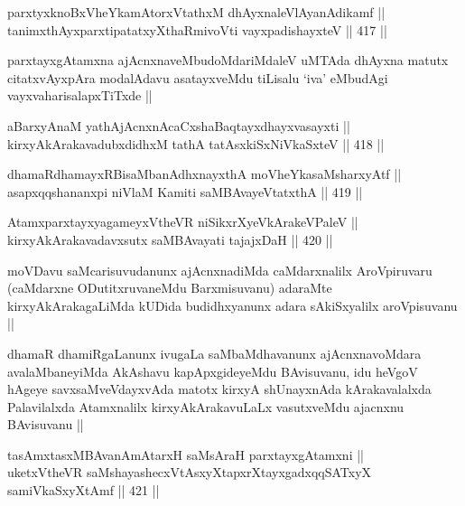 
\begin{shl}
parxtyxknoBxVheYkamAtorxVtathxM dhAyxnaleVlAyanAdikamf || \\
tanimxthAyxparxtipatatxyXthaRmivoVti vayxpadishayxteV ||  417 ||  
\end{shl}

\begin{artha}
parxtayxgAtamxna ajAcnxnaveMbudoMdariMdaleV uMTAda dhAyxna matutx citatxvAyxpAra modalAdavu asatayxveMdu tiLisalu `iva' eMbudAgi vayxvaharisalapxTiTxde ||
\end{artha}


\begin{shl}
aBarxyAnaM yathA\s jAcnxnAcaCxshaBaqtayxdhayxvasayxti || \\
kirxyAkArakavadubxdidhxM tathA tatAsxkiSxNiVkaSxteV ||  418 ||  
\end{shl}

\begin{shl}
dhamaRdhamayxRBisaMbanAdhxnayxthA moVheYkasaMsharxyAtf || \\
asapxqqshananxpi niVlaM Kamiti saMBAvayeVtatxthA ||  419 ||  
\end{shl}
				
\begin{shl}
AtamxparxtayxyagameyxV\s theVR niSikxrXyeV\s kArakeV\s PaleV || \\
kirxyAkArakavadavxsutx saMBAvayati tajajxDaH ||  420 ||  
\end{shl}

\begin{artha}
moVDavu saMcarisuvudanunx ajAcnxnadiMda caMdarxnalilx AroVpiruvaru (caMdarxne ODutitxruvaneMdu Barxmisuvanu) adaraMte kirxyAkArakagaLiMda kUDida budidhxyanunx adara sAkiSxyalilx aroVpisuvanu ||
\end{artha}

\begin{artha}
dhamaR dhamiRgaLanunx ivugaLa saMbaMdhavanunx ajAcnxnavoMdara avalaMbaneyiMda AkAshavu kapApxgideyeMdu BAvisuvanu, idu heVgoV hAgeye savxsaMveVdayxvAda matotx kirxyA shUnayxnAda kArakavalalxda Palavilalxda Atamxnalilx kirxyAkArakavuLaLx vasutxveMdu ajacnxnu BAvisuvanu ||
\end{artha}

\begin{shl}
tasAmxtasxMBAvanAmAtarxH saMsAraH parxtayxgAtamxni || \\
uketxV\s theVR saMshayashecxVtAsxyXtapxrXtayxgadxqqSATxyX samiVkaSxyXtAmf ||  421 ||  
\end{shl}

